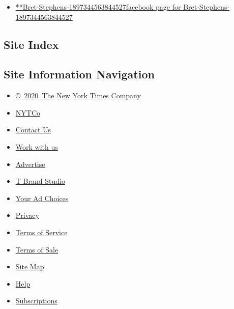 \begin{itemize}
\tightlist
\item
  \href{https://www.facebookcorewwwi.onion/Bret-Stephens-1897344563844527}{**Bret-Stephens-1897344563844527facebook
  page for Bret-Stephens-1897344563844527}
\end{itemize}

\hypertarget{site-index}{%
\subsection{Site Index}\label{site-index}}

\hypertarget{site-information-navigation}{%
\subsection{Site Information
Navigation}\label{site-information-navigation}}

\begin{itemize}
\tightlist
\item
  \href{https://help.nytimes3xbfgragh.onion/hc/en-us/articles/115014792127-Copyright-notice}{©~2020~The
  New York Times Company}
\end{itemize}

\begin{itemize}
\tightlist
\item
  \href{https://www.nytco.com/}{NYTCo}
\item
  \href{https://help.nytimes3xbfgragh.onion/hc/en-us/articles/115015385887-Contact-Us}{Contact
  Us}
\item
  \href{https://www.nytco.com/careers/}{Work with us}
\item
  \href{https://nytmediakit.com/}{Advertise}
\item
  \href{http://www.tbrandstudio.com/}{T Brand Studio}
\item
  \href{https://www.nytimes3xbfgragh.onion/privacy/cookie-policy\#how-do-i-manage-trackers}{Your
  Ad Choices}
\item
  \href{https://www.nytimes3xbfgragh.onion/privacy}{Privacy}
\item
  \href{https://help.nytimes3xbfgragh.onion/hc/en-us/articles/115014893428-Terms-of-service}{Terms
  of Service}
\item
  \href{https://help.nytimes3xbfgragh.onion/hc/en-us/articles/115014893968-Terms-of-sale}{Terms
  of Sale}
\item
  \href{https://spiderbites.nytimes3xbfgragh.onion}{Site Map}
\item
  \href{https://help.nytimes3xbfgragh.onion/hc/en-us}{Help}
\item
  \href{https://www.nytimes3xbfgragh.onion/subscription?campaignId=37WXW}{Subscriptions}
\end{itemize}
